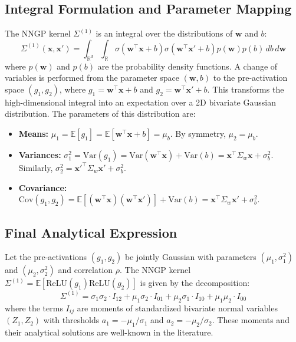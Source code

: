 \documentclass[a4paper]{article}
\begin{document}
\subsection{Integral Formulation and Parameter Mapping}
The NNGP kernel $\Sigma^{(1)}$ is an integral over the distributions of $\bm{w}$ and $b$:
\begin{equation}
    \Sigma^{(1)}(\bm{x}, \bm{x}') = \int_{\mathbb{R}^d} \int_{\mathbb{R}} \sigma(\bm{w}^\top \bm{x} + b)\sigma(\bm{w}^\top \bm{x}' + b) p(\bm{w})p(b) \,db \,d\bm{w}
\end{equation}
where $p(\bm{w})$ and $p(b)$ are the probability density functions. A change of variables is performed from the parameter space $(\bm{w}, b)$ to the pre-activation space $(g_1, g_2)$, where $g_1 = \bm{w}^\top \bm{x} + b$ and $g_2 = \bm{w}^\top \bm{x}' + b$. This transforms the high-dimensional integral into an expectation over a 2D bivariate Gaussian distribution. The parameters of this distribution are:
\begin{itemize}
    \item \textbf{Means:} $\mu_1 = \mathbb{E}[g_1] = \mathbb{E}[\bm{w}^\top\bm{x} + b] = \mu_b$. By symmetry, $\mu_2 = \mu_b$.
    \item \textbf{Variances:} $\sigma_1^2 = \text{Var}(g_1) = \text{Var}(\bm{w}^\top\bm{x}) + \text{Var}(b) = \bm{x}^\top \Sigma_w \bm{x} + \sigma_b^2$. Similarly, $\sigma_2^2 = {\bm{x}'}^\top \Sigma_w \bm{x}' + \sigma_b^2$.
    \item \textbf{Covariance:} $\text{Cov}(g_1, g_2) = \mathbb{E}[(\bm{w}^\top\bm{x})(\bm{w}^\top\bm{x}')] + \text{Var}(b) = \bm{x}^\top \Sigma_w \bm{x}' + \sigma_b^2$.
\end{itemize}

\subsection{Final Analytical Expression}
\begin{theorem}
Let the pre-activations $(g_1, g_2)$ be jointly Gaussian with parameters $(\mu_1, \sigma_1^2)$ and $(\mu_2, \sigma_2^2)$ and correlation $\rho$. The NNGP kernel $\Sigma^{(1)} = \mathbb{E}[\text{ReLU}(g_1)\text{ReLU}(g_2)]$ is given by the decomposition:
\begin{equation}
\label{eq:final_ntk_decomp}
\boxed{
\Sigma^{(1)} = \sigma_1\sigma_2 \cdot I_{12} + \mu_1\sigma_2 \cdot I_{01} + \mu_2\sigma_1 \cdot I_{10} + \mu_1\mu_2 \cdot I_{00}
}
\end{equation}
where the terms $I_{ij}$ are moments of standardized bivariate normal variables $(Z_1, Z_2)$ with thresholds $a_1 = -\mu_1/\sigma_1$ and $a_2 = -\mu_2/\sigma_2$. These moments and their analytical solutions are well-known in the literature.
\end{theorem}
\end{document}
